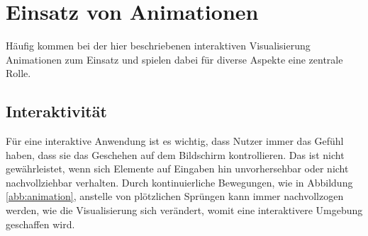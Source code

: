 \section{Einsatz von Animationen}\label{sec:animation}
Häufig kommen bei der hier beschriebenen interaktiven Visualisierung Animationen zum Einsatz und spielen dabei für diverse Aspekte eine zentrale Rolle. 

\subsection{Interaktivität}
Für eine interaktive Anwendung ist es wichtig, dass Nutzer immer das Gefühl haben, dass sie das Geschehen auf dem Bildschirm kontrollieren. Das ist nicht gewährleistet, wenn sich Elemente auf Eingaben hin unvorhersehbar oder nicht nachvollziehbar verhalten. Durch kontinuierliche Bewegungen, wie in Abbildung \ref{abb:animation}, anstelle von plötzlichen Sprüngen kann immer nachvollzogen werden, wie die Visualisierung sich verändert, womit eine interaktivere Umgebung geschaffen wird.

